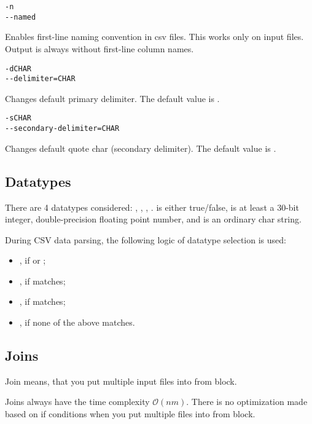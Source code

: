 \begin{verbatim}
-n
--named
\end{verbatim}
Enables first-line naming convention in csv files. This works only on input files. 
Output is always without first-line column names.

\begin{verbatim}
-dCHAR
--delimiter=CHAR
\end{verbatim}
Changes default primary delimiter. The default value is \icode{,}.

\begin{verbatim}
-sCHAR
--secondary-delimiter=CHAR
\end{verbatim}
Changes default quote char (secondary delimiter). The default value is .

\subsection{Datatypes}
There are 4 datatypes considered: , , , . 
 is either true/false,  is at least a 30-bit integer,  double-precision floating point number, and  is an ordinary char string.

During CSV data parsing, the following logic of datatype selection is used:
\begin{itemize}
    \item {}, if  or ;
    \item {}, if \icode{[0-9]+} matches;
    \item {}, if  matches;
    \item {}, if none of the above matches.
\end{itemize}

\subsection{Joins}
Join means, that you put multiple input files into from block.

Joins always have the time complexity $\mathcal{O}(nm)$. There is no optimization made based on if conditions when you put multiple files into from block.

